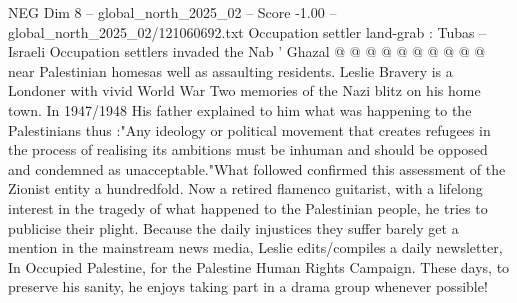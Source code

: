 \begin{textsample}{NEG Dim 8 – global\_north\_2025\_02 – Score -1.00 – global\_north\_2025\_02/121060692.txt}
Occupation settler land-grab : Tubas -- Israeli Occupation settlers invaded the Nab ' Ghazal @ @ @ @ @ @ @ @ @ @ near Palestinian homesas well as assaulting residents.
Leslie Bravery is a Londoner with vivid World War Two memories of the Nazi blitz on his home town.
In 1947/1948 His father explained to him what was happening to the Palestinians thus :"Any ideology or political movement that creates refugees in the process of realising its ambitions must be inhuman and should be opposed and condemned as unacceptable."What followed confirmed this assessment of the Zionist entity a hundredfold.
Now a retired flamenco guitarist, with a lifelong interest in the tragedy of what happened to the Palestinian people, he tries to publicise their plight.
Because the daily injustices they suffer barely get a mention in the mainstream news media, Leslie edits/compiles a daily newsletter, In Occupied Palestine, for the Palestine Human Rights Campaign.
These days, to preserve his sanity, he enjoys taking part in a drama group whenever possible!

\end{textsample}
